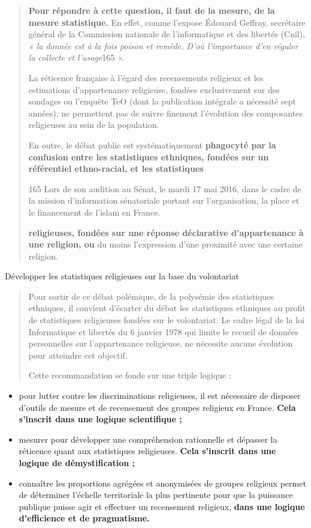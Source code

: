 \begin{quote}
\textbf{Pour répondre à cette question, il faut de la mesure, de la
mesure statistique.} En effet, comme l'expose Édouard Geffray,
secrétaire général de la Commission nationale de l'informatique et des
libertés (Cnil), \emph{« la donnée est à la fois poison et remède. D'où
l'importance d'en réguler la collecte et l'usage}165 \emph{».}

La réticence française à l'égard des recensements religieux et les
estimations d'appartenance religieuse, fondées exclusivement sur des
sondages ou l'enquête TeO (dont la publication intégrale a nécessité
sept années), ne permettent pas de suivre finement l'évolution des
composantes religieuses au sein de la population.

En outre, le débat public est systématiquement \textbf{phagocyté par la
confusion entre les statistiques ethniques, fondées sur un référentiel
ethno-racial, et les statistiques}

165 Lors de son audition au Sénat, le mardi 17 mai 2016, dans le cadre
de la mission d'information sénatoriale portant sur l'organisation, la
place et le financement de l'islam en France.



\textbf{religieuses, fondées sur une réponse déclarative d'appartenance
à une religion, ou} du moins l'expression d'une proximité avec une
certaine religion.
\end{quote}

Développer les statistiques religieuses sur la base du volontariat

\begin{quote}
Pour sortir de ce débat polémique, de la polysémie des statistiques
ethniques, il convient d'écarter du débat les statistiques ethniques au
profit de statistiques religieuses fondées sur le volontariat. Le cadre
légal de la loi Informatique et libertés du 6 janvier 1978 qui limite le
recueil de données personnelles sur l'appartenance religieuse, ne
nécessite aucune évolution pour atteindre cet objectif.

Cette recommandation se fonde sur une triple logique :
\end{quote}

\begin{itemize}
\item
  pour lutter contre les discriminations religieuses, il est nécessaire
  de disposer d'outils de mesure et de recensement des groupes religieux
  en France. \textbf{Cela s'inscrit dans une logique scientifique ;}
\item
  mesurer pour développer une compréhension rationnelle et dépasser la
  réticence quant aux statistiques religieuses. \textbf{Cela s'inscrit
  dans une logique de démystification ;}
\item
  connaître les proportions agrégées et anonymisées de groupes religieux
  permet de déterminer l'échelle territoriale la plus pertinente pour
  que la puissance publique puisse agir et effectuer un recensement
  religieux, \textbf{dans une logique d'efficience et de pragmatisme.}
\end{itemize}

